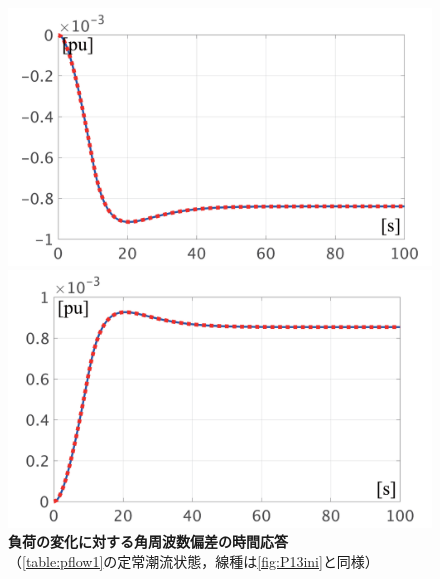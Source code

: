 \documentclass[tombow,dvipdfmx]{corona-a5-1.1}
\begin{document}
\begin{figure}[t]
  \centering
  {
  \begin{minipage}{0.49\linewidth}
    \centering
    \includegraphics[width = 1.0\linewidth]{figs/P1mi}
  \end{minipage}
  \begin{minipage}{0.49\linewidth}
    \centering
    \includegraphics[width = 1.0\linewidth]{figs/P1pl}
  \end{minipage}
  \medskip
  \caption{\textbf{負荷の変化に対する角周波数偏差の時間応答}
  \\ \centering（\ref{table:pflow1}の定常潮流状態，線種は\ref{fig:P13ini}と同様）}
  \label{fig:P1load}
  }
\medskip
\end{figure}
\end{document}
